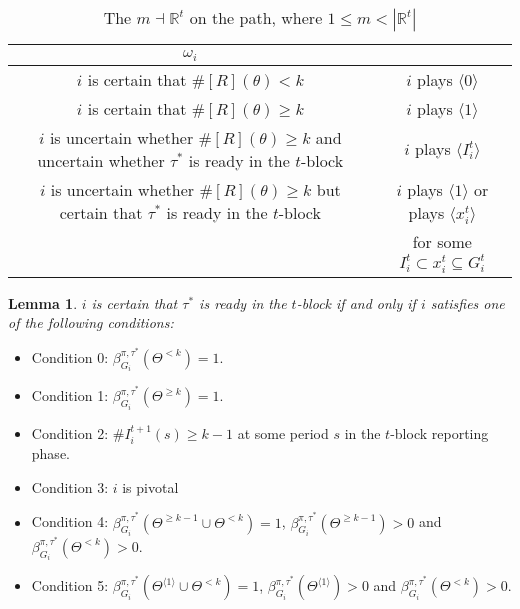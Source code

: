 \documentclass[12pt,letter]{article}
\newcommand{\Omicron}{\mathbb{R}}
\newtheorem{lemma}{Lemma}[section]
\theoremstyle{definition}
\theoremstyle{definition}
\theoremstyle{remark}
\theoremstyle{claim}
\begin{document}
\begin{landscape}
\begin{table}[!htbp]
\caption{The $m\dashv\Omicron^t$ on the path, where $1\leq m < |\Omicron^t|$}
\label{table:eqm_path_ot1}
\begin{center}
\begin{tabular}{c | c }
$\omega_i$ 	 & 	    \\
\hline
\hline
$i$ is certain that $\#[R](\theta)<k$ &  $i$ plays $\langle 0 \rangle$  		\\
$i$ is certain that $\#[R](\theta)\geq k$  	& $i$ plays $\langle 1 \rangle$ \\
$i$ is uncertain whether $\#[R](\theta)\geq k$ and uncertain whether $\tau^{*}$ is ready in the $t$-block 	&  $i$ plays $\langle I^t_i \rangle$		 \\
$i$ is uncertain whether $\#[R](\theta)\geq k$ but certain that $\tau^{*}$ is ready in the $t$-block	  	& $i$ plays $\langle 1 \rangle$ or plays $\langle x^t_i \rangle$ \\
& for some $I^t_i\subset x^t_i \subseteq G^t_i$ \\
\hline
\end{tabular}
\end{center}
\end{table}

\end{landscape}

\begin{lemma}
$i$ is certain that $\tau^{*}$ is ready in the $t$-block if and only if $i$ satisfies one of the following conditions: 
\end{lemma}
\begin{itemize}
\item Condition 0: $\beta^{\pi,\tau^{*}}_{G_i} (\Theta^{<k})=1$.
\item Condition 1: $\beta^{\pi,\tau^{*}}_{G_i} (\Theta^{\geq k})=1$.
\item Condition 2: $\#I^{t+1}_i(s)\geq k-1$ at some period $s$ in the $t$-block reporting phase.
\item Condition 3: $i$ is pivotal
\item Condition 4: $\beta^{\pi,\tau^{*}}_{G_i}(\Theta^{\geq k-1} \cup \Theta^{<k})=1$, $\beta^{\pi,\tau^{*}}_{G_i}(\Theta^{\geq k-1})>0$ and $\beta^{\pi,\tau^{*}}_{G_i}(\Theta^{< k})>0$. 
\item Condition 5: $\beta^{\pi,\tau^{*}}_{G_i}( \Theta^{\langle 1 \rangle} \cup \Theta^{<k})=1$, $\beta^{\pi,\tau^{*}}_{G_i}(\Theta^{\langle 1 \rangle})>0$ and $\beta^{\pi,\tau^{*}}_{G_i}(\Theta^{< k})>0$. 
\end{itemize}
\end{document}
